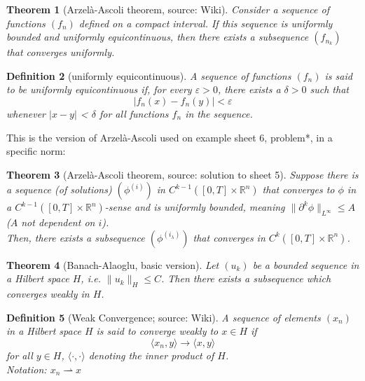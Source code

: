 \documentclass[12pt,a4paper]{article}
\newtheorem{definition}{Definition}
\newtheorem{thm}[definition]{Theorem}
\begin{document}
\begin{thm}[Arzelà-Ascoli theorem, source: Wiki]
Consider a sequence of functions $(f_n)$ defined on a compact interval. If this sequence is uniformly bounded and uniformly equicontinuous, then there exists a subsequence $(f_{n_k})$ that converges uniformly.
\end{thm}

\begin{definition}[uniformly equicontinuous]
A sequence of functions $(f_n)$ is said to be uniformly equicontinuous if, for every $\varepsilon > 0$, there exists a $\delta > 0$ such that
\begin{equation}
\left|f_{n}(x)-f_{n}(y)\right|<\varepsilon
\end{equation}
whenever $| x-y |$ < $\delta$ for all functions $f_n$ in the sequence.
\end{definition}

This is the version of Arzelà-Ascoli used on example sheet 6, problem*, in a specific norm:

\begin{thm}[Arzelà-Ascoli theorem, source: solution to sheet 5]
Suppose there is a sequence (of solutions) $(\phi^{(i)})$ in $C^{k-1}([0,T]\times \mathbb{R}^n)$ that converges to $\phi$ in a $C^{k-1}([0,T]\times \mathbb{R}^n)$-sense and is uniformly bounded, meaning $\lVert \partial ^k \phi \rVert _{L^{\infty}} \leq A$ ($A$ not dependent on $i$).\\
Then, there exists a subsequence $(\phi^{(i_{\lambda})})$ that converges in $C^{k}([0,T]\times \mathbb{R}^n)$.
\end{thm}

\begin{thm}[Banach-Alaoglu, basic version]
Let $(u_k)$ be a bounded sequence in a Hilbert space $H$, i.e. $\lVert u_k \rVert_H \leq C$. Then there exists a subsequence which converges weakly in $H$.
\end{thm}

\begin{definition}[Weak Convergence; source: Wiki]
A sequence of elements $(x_n)$ in a Hilbert space $H$ is said to converge weakly to $x\in H$ if
\begin{equation}
\langle x_n, y \rangle \rightarrow \langle x, y \rangle
\end{equation}
for all $y\in H$, $\langle \cdot , \cdot \rangle$ denoting the inner product of $H$. \\
Notation: $x_n \rightharpoonup x$
\end{definition}
\end{document}
